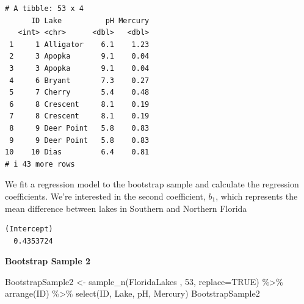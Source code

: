\documentclass[
  letterpaper,
  DIV=11,
  numbers=noendperiod]{scrreprt}
\newenvironment{Shaded}{\begin{snugshade}}{\end{snugshade}}
\newcommand{\AttributeTok}[1]{\textcolor[rgb]{0.40,0.45,0.13}{#1}}
\newcommand{\CommentTok}[1]{\textcolor[rgb]{0.37,0.37,0.37}{#1}}
\newcommand{\ConstantTok}[1]{\textcolor[rgb]{0.56,0.35,0.01}{#1}}
\newcommand{\DecValTok}[1]{\textcolor[rgb]{0.68,0.00,0.00}{#1}}
\newcommand{\DocumentationTok}[1]{\textcolor[rgb]{0.37,0.37,0.37}{\textit{#1}}}
\newcommand{\FunctionTok}[1]{\textcolor[rgb]{0.28,0.35,0.67}{#1}}
\newcommand{\NormalTok}[1]{\textcolor[rgb]{0.00,0.23,0.31}{#1}}
\newcommand{\OtherTok}[1]{\textcolor[rgb]{0.00,0.23,0.31}{#1}}
\newcommand{\SpecialCharTok}[1]{\textcolor[rgb]{0.37,0.37,0.37}{#1}}
\begin{document}
\begin{verbatim}
# A tibble: 53 x 4
      ID Lake          pH Mercury
   <int> <chr>      <dbl>   <dbl>
 1     1 Alligator    6.1    1.23
 2     3 Apopka       9.1    0.04
 3     3 Apopka       9.1    0.04
 4     6 Bryant       7.3    0.27
 5     7 Cherry       5.4    0.48
 6     8 Crescent     8.1    0.19
 7     8 Crescent     8.1    0.19
 8     9 Deer Point   5.8    0.83
 9     9 Deer Point   5.8    0.83
10    10 Dias         6.4    0.81
# i 43 more rows
\end{verbatim}

We fit a regression model to the bootstrap sample and calculate the
regression coefficients. We're interested in the second coefficient,
\(b_1\), which represents the mean difference between lakes in Southern
and Northern Florida

\begin{Shaded}
\end{Shaded}

\begin{verbatim}
(Intercept) 
  0.4353724 
\end{verbatim}

\textbf{Bootstrap Sample 2}

\begin{Shaded}
\begin{Highlighting}[]
\NormalTok{BootstrapSample2 }\OtherTok{\textless{}{-}} \FunctionTok{sample\_n}\NormalTok{(FloridaLakes , }\DecValTok{53}\NormalTok{, }\AttributeTok{replace=}\ConstantTok{TRUE}\NormalTok{)  }\SpecialCharTok{\%\textgreater{}\%} \FunctionTok{arrange}\NormalTok{(ID) }\SpecialCharTok{\%\textgreater{}\%} 
  \FunctionTok{select}\NormalTok{(ID, Lake, pH, Mercury)}
\NormalTok{BootstrapSample2}
\end{Highlighting}
\end{Shaded}
\end{document}
